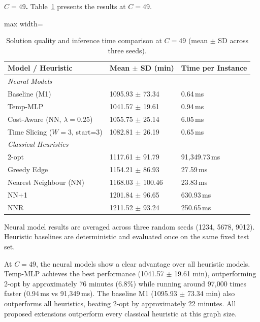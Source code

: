 \textbf{$C = 49$.} Table~\ref{tab:heuristic_c49} presents the results at $C = 49$.

\begin{table}[H]
\centering
\caption{Solution quality and inference time comparison at $C = 49$ (mean $\pm$ SD across three seeds).}
\label{tab:heuristic_c49}
\begin{adjustbox}{max width=\textwidth}
\begin{tabular}{lll}
\toprule
\textbf{Model / Heuristic} & \textbf{Mean $\pm$ SD (min)} & \textbf{Time per Instance} \\
\midrule
\multicolumn{3}{l}{\textit{Neural Models}} \\
Baseline (M1)                 & 1095.93 $\pm$ 73.34 & 0.64\,ms \\
Temp-MLP                      & 1041.57 $\pm$ 19.61 & 0.94\,ms \\
Cost-Aware (NN, $\lambda=0.25$) & 1055.75 $\pm$ 25.14 & 6.05\,ms \\
Time Slicing ($W=3$, start=3) & 1082.81 $\pm$ 26.19 & 0.65\,ms \\
\midrule
\multicolumn{3}{l}{\textit{Classical Heuristics}} \\
2-opt                  & 1117.61 $\pm$ 91.79  & 91{,}349.73\,ms \\
Greedy Edge            & 1154.21 $\pm$ 86.93  & 27.59\,ms \\
Nearest Neighbour (NN) & 1168.03 $\pm$ 100.46 & 23.83\,ms \\
NN+1                   & 1201.84 $\pm$ 96.65  & 630.93\,ms \\
NNR                    & 1211.52 $\pm$ 93.24  & 250.65\,ms \\
\bottomrule
\end{tabular}
\end{adjustbox}
\smallskip
\begin{minipage}{\linewidth}
\small Neural model results are averaged across three random seeds (1234, 5678, 9012). Heuristic baselines are deterministic and evaluated once on the same fixed test set.
\end{minipage}
\end{table}


\medskip

At $C = 49$, the neural models show a clear advantage over all heuristic models. Temp-MLP
achieves the best performance (1041.57 $\pm$ 19.61 min), outperforming 2-opt by approximately
76 minutes (6.8\%) while running around 97,000 times faster (0.94\,ms vs 91,349\,ms). The
baseline M1 (1095.93 $\pm$ 73.34 min) also outperforms all heuristics, beating 2-opt by
approximately 22 minutes. All proposed extensions outperform every classical heuristic at
this graph size.

